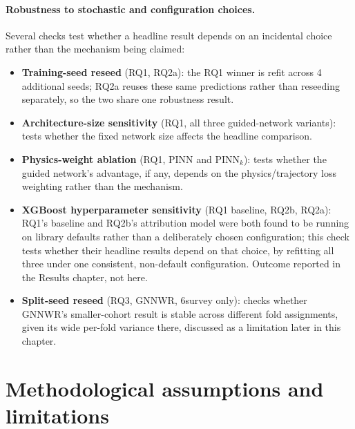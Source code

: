 \documentclass[11pt,a4paper]{report}
\begin{document}
\paragraph*{Robustness to stochastic and configuration choices.}
Several checks test whether a headline result depends on an incidental choice rather than the
mechanism being claimed:
\begin{itemize}
\setlength\itemsep{0pt}
\item \textbf{Training-seed reseed} (RQ1, RQ2a): the RQ1 winner is refit across 4 additional
  seeds; RQ2a reuses these same predictions rather than reseeding separately, so the two share one
  robustness result.
\item \textbf{Architecture-size sensitivity} (RQ1, all three guided-network variants): tests
  whether the fixed network size affects the headline comparison.
\item \textbf{Physics-weight ablation} (RQ1, PINN and PINN$_k$): tests whether the guided
  network's advantage, if any, depends on the physics/trajectory loss weighting rather than the
  mechanism.
\item \textbf{XGBoost hyperparameter sensitivity} (RQ1 baseline, RQ2b, RQ2a): RQ1's baseline and
  RQ2b's attribution model were both found to be running on library defaults rather than a
  deliberately chosen configuration; this check tests whether their headline results depend on
  that choice, by refitting all three under one consistent, non-default configuration. Outcome
  reported in the Results chapter, not here.
\item \textbf{Split-seed reseed} (RQ3, GNNWR, 6survey only): checks whether GNNWR's
  smaller-cohort result is stable across different fold assignments, given its wide per-fold
  variance there, discussed as a limitation later in this chapter.
\end{itemize}

\section{Methodological assumptions and limitations}

\end{document}
